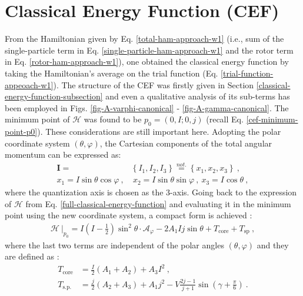 \section{Classical Energy Function (CEF)}

From the Hamiltonian given by Eq. \ref{total-ham-approach-w1} (i.e., sum of the single-particle term in Eq. \ref{single-particle-ham-approach-w1} and the rotor term in Eq. \ref{rotor-ham-approach-w1}), one obtained the classical energy function by taking the Hamiltonian's average on the trial function (Eq. \ref{trial-function-appeoach-w1}). The structure of the CEF was firstly given in Section \ref{classical-energy-function-subsection} and even a qualitative analysis of its sub-terms has been employed in Figs. \ref{fig-A-varphi-canonical} - \ref{fig-A-gamma-canonical}. The minimum point of $\mathcal{H}$ was found to be $p_0=(0,I;0,j)$ (recall Eq. \ref{cef-minimum-point-p0}). These considerations are still important here. Adopting the polar coordinate system $(\theta,\varphi)$, the Cartesian components of the total angular momentum can be expressed as:
\begin{align}
    \mathbf{I}=&\left\{I_1,I_2,I_3\right\}\stackrel{not.}{=}\left\{x_1,x_2,x_3\right\}\ ,\nonumber\\
    x_1=I\sin\theta\cos\varphi\ ,&\ x_2=I\sin\theta\sin\varphi\ ,\ x_3=I\cos\theta\ ,
\end{align}
where the quantization axis is chosen as the $3$-axis. Going back to the expression of $\mathcal{H}$ from Eq. \ref{full-classical-energy-function} and evaluating it in the minimum point using the new coordinate system, a compact form is achieved \cite{poenaru2021extensive2}:
\begin{align}
    \left. \mathcal{H}\ \right\vert_{p_0}=I\left(I-\frac{1}{2}\right)\sin^2\theta\cdot \mathcal{A}_\varphi-2A_1Ij\sin\theta+T_\text{core}+T_\text{sp}\ ,
    \label{CEF-minimum-point-Tcore-Tsp}
\end{align}
where the last two terms are independent of the polar angles $(\theta,\varphi)$ and they are defined as \cite{poenaru2021extensive2}:
\begin{align}
    T_\text{core}&=\frac{I}{2}(A_1+A_2)+A_3I^2\ ,\\
    T_\text{s.p.}&=\frac{j}{2}(A_2+A_3)+A_1j^2-V\frac{2j-1}{j+1}\sin\left(\gamma+\frac{\pi}{6}\right)\ .
    \label{core-sp-sub-terms}
\end{align}

